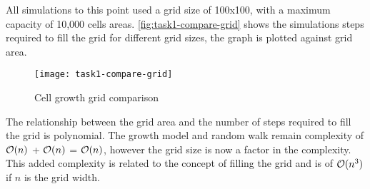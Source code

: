 All simulations to this point used a grid size of 100x100, with a maximum capacity of 10,000 cells areas.
\autoref{fig:task1-compare-grid} shows the simulations steps required to fill the grid for different grid sizes,
the graph is plotted against grid area.

\begin{figure}[ht]
    \centering
    \texttt{[image: task1-compare-grid]}
    \caption[Cell growth grid comparison]{Cell growth grid comparison}
    \label{fig:task1-compare-grid}
\end{figure}

The relationship between the grid area and the number of steps required to fill the grid is polynomial.
The growth model and random walk remain complexity of $\mathcal{O}(n)$ + $\mathcal{O}(n)$ = $\mathcal{O}(n)$,
however the grid size is now a factor in the complexity.
This added complexity is related to the concept of filling the grid and is of $\mathcal{O}(n^3)$ if $n$ is the grid width.